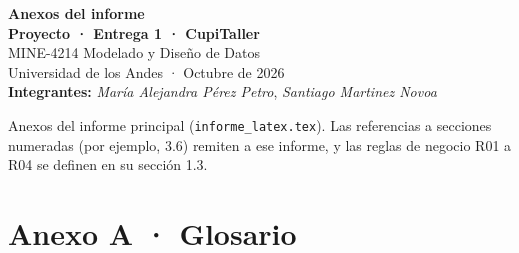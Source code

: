 \documentclass[11pt,letterpaper]{article}
\begin{document}
\begin{center}
{\Large\bfseries Anexos del informe\\[2pt] Proyecto · Entrega 1 · CupiTaller}\\[8pt]
MINE-4214 Modelado y Diseño de Datos\\
Universidad de los Andes · Octubre de 2026\\[6pt]
\textbf{Integrantes:} \emph{María Alejandra Pérez Petro}, \emph{Santiago Martinez Novoa}
\end{center}
\tableofcontents
\vspace{4pt}
Anexos del informe principal (\texttt{informe\_latex.tex}). Las referencias a secciones numeradas (por ejemplo, 3.6) remiten a ese informe, y las reglas de negocio R01 a R04 se definen en su sección 1.3.
\bigskip
\section*{Anexo A · Glosario}
\end{document}
